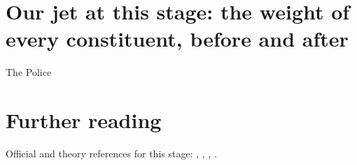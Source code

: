 \section{Our jet at this stage: the weight of every constituent, before and after}
\label{sec:the_police:our_jet_at_this_stage_the_weight_of_ever}

\begin{ledger}{The Police}
\end{ledger}

\section{Further reading}
\label{sec:the_police:further_reading}
Official and theory references for this stage: \cite{Bertolini:2014bba}, \cite{CMS:2020ebo}, \cite{Cacciari:2014gra}, \cite{Berta:2014eza}.

\begin{pitfalls}
\end{pitfalls}

\begin{exercises}
\item {}
\item {}
\end{exercises}
